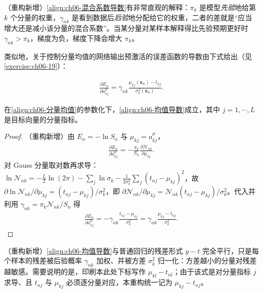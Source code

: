 \documentclass[../../main.tex]{subfiles}
\begin{document}
\begin{remark}（重构新增）\eqref{align:ch06-混合系数导数}有非常直观的解释：$\pi_k$ 是模型\emph{先验}地给第 $k$ 个分量的权重，$\gamma_{nk}$ 是看到数据后\emph{后验}地分配给它的权重，二者的差就是“应当增大还是减小该分量的混合系数”。当某分量对某样本解释得比先验预期更好时 $\gamma_{nk}>\pi_k$，梯度为负，梯度下降会增大 $\pi_k$。
\end{remark}

类似地，关于控制分量均值的网络输出预激活的误差函数的导数由下式给出（见\cref{exercise:ch06-19}）：

\begin{align}
\frac{\partial E_n}{\partial a_{kj}^{\mu}}=\gamma_{nk}\frac{\mu_{kj}(\boldsymbol{x}_n)-t_{nj}}{\sigma_k^{2}(\boldsymbol{x}_n)}.
\label{align:ch06-均值导数}
\end{align}

\begin{proposition}[分量均值预激活的导数]\label{proposition:ch06-均值导数}
在\eqref{align:ch06-分量均值}的参数化下，\eqref{align:ch06-均值导数}成立，其中 $j=1,\cdots,L$ 是目标向量的分量指标。
\end{proposition}

\begin{proof}
（重构新增）由 $E_n=-\ln S_n$ 与 $\mu_{kj}=a_{kj}^{\mu}$，
\begin{align}
\frac{\partial E_n}{\partial a_{kj}^{\mu}}=-\frac{\pi_k}{S_n}\frac{\partial\mathcal{N}_{nk}}{\partial\mu_{kj}}.
\end{align}
对 Gauss 分量取对数再求导：$\ln\mathcal{N}_{nk}=-\frac{L}{2}\ln(2\pi)-\sum_{j}\ln\sigma_k-\frac{1}{2\sigma_k^{2}}\sum_{j}(t_{nj}-\mu_{kj})^{2}$，故 $\partial\ln\mathcal{N}_{nk}/\partial\mu_{kj}=(t_{nj}-\mu_{kj})/\sigma_k^{2}$，即 $\partial\mathcal{N}_{nk}/\partial\mu_{kj}=\mathcal{N}_{nk}(t_{nj}-\mu_{kj})/\sigma_k^{2}$。代入并利用 $\gamma_{nk}=\pi_k\mathcal{N}_{nk}/S_n$ 得
\begin{align}
\frac{\partial E_n}{\partial a_{kj}^{\mu}}
=-\gamma_{nk}\frac{t_{nj}-\mu_{kj}}{\sigma_k^{2}}
=\gamma_{nk}\frac{\mu_{kj}-t_{nj}}{\sigma_k^{2}}.
\end{align}
\end{proof}

\begin{remark}（重构新增）\eqref{align:ch06-均值导数}与普通回归的残差形式 $y-t$ 完全平行，只是每个样本的残差被后验概率 $\gamma_{nk}$ 加权、并被方差 $\sigma_k^{2}$ 归一化：方差越小的分量对残差越敏感。需要说明的是，印刷本此处下标写作 $\mu_{kl}-t_{nl}$；由于该式是对分量指标 $j$ 求导、且 $t_{nj}$ 与 $\mu_{kj}$ 必须逐分量对应，本重构统一记为 $\mu_{kj}-t_{nj}$。
\end{remark}
\end{document}
